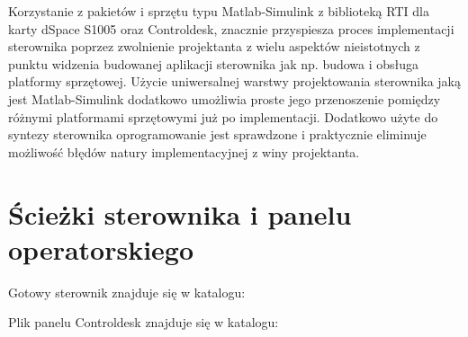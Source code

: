 \documentclass[12pt]{article}
\begin{document}
Korzystanie z pakietów i sprzętu typu Matlab-Simulink z biblioteką RTI dla karty
dSpace S1005 oraz Controldesk, znacznie przyspiesza proces implementacji
sterownika poprzez zwolnienie projektanta z wielu aspektów nieistotnych z punktu
widzenia budowanej aplikacji sterownika jak np. budowa i obsługa platformy
sprzętowej. Użycie uniwersalnej warstwy projektowania sterownika jaką jest
Matlab-Simulink dodatkowo umożliwia proste jego przenoszenie pomiędzy różnymi
platformami sprzętowymi już po implementacji. Dodatkowo użyte do syntezy
sterownika oprogramowanie jest sprawdzone i praktycznie eliminuje możliwość
błędów natury implementacyjnej z winy projektanta.

\newpage

\section{Ścieżki sterownika i panelu operatorskiego}

Gotowy sterownik znajduje się w katalogu:


\vspace{0.3cm}
\noindent
Plik panelu Controldesk znajduje się w katalogu:

\end{document}
